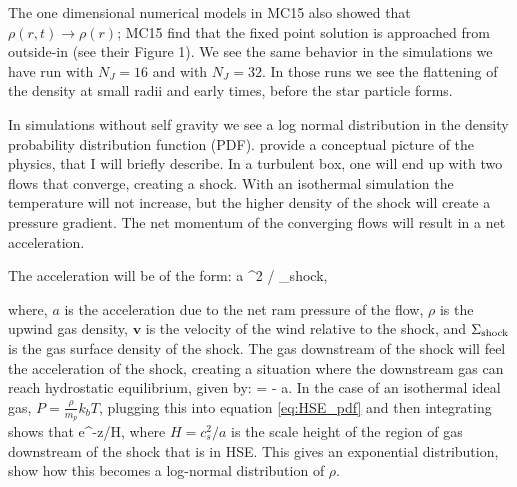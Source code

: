 \documentclass[../dissertation.tex]{subfiles}
\begin{document}
The one dimensional numerical models in MC15 also showed that
$\rho(r,t)\to \rho(r)$; MC15 find that the fixed point solution is
approached from outside-in (see their Figure 1). We see the
same behavior in the simulations we have run with $N_J = 16$ and
with $N_J=32$. In those runs we see the flattening of the density at
small radii and early times, before the star particle forms. 

In simulations without self gravity we see a log normal distribution in the density probability distribution function (PDF). 
\citet{2018ApJ...854...88R} provide a conceptual picture of the physics, that I will briefly describe.
In a turbulent box, one will end up with two flows that converge, creating a shock. 
With an isothermal simulation the temperature will not increase, but the higher density of the shock will create a pressure gradient. 
The net momentum of the converging flows will result in a net acceleration. %

The acceleration will be of the form:
\be
a \approx {}^2 / \Sigma_{\rm shock},
\ee

where, $a$ is the acceleration due to the net ram pressure of the flow, $\rho$ is the upwind gas density, $\mathbf v$ is the velocity of the wind relative to the shock, and $\Sigma_{\rm shock}$ is the gas surface density of the shock. 
The gas downstream of the shock will feel the acceleration of the shock, creating a situation where the downstream gas can reach hydrostatic equilibrium, given by: 
\be
\label{eq:HSE_pdf}
 = - \rho a.
\ee
In the case of an isothermal ideal gas, $P = \frac{\rho}{m_p} k_b T$, plugging this into equation \ref{eq:HSE_pdf} and then integrating shows that
%
\be
\rho \propto e^{-z/H},
\ee
%
where $H = c_s^2 / a$ is the scale height of the region of gas downstream of the shock that is in HSE.
This gives an exponential distribution, \citet{2018ApJ...854...88R} show how this becomes a log-normal distribution of $\rho$.
\end{document}
